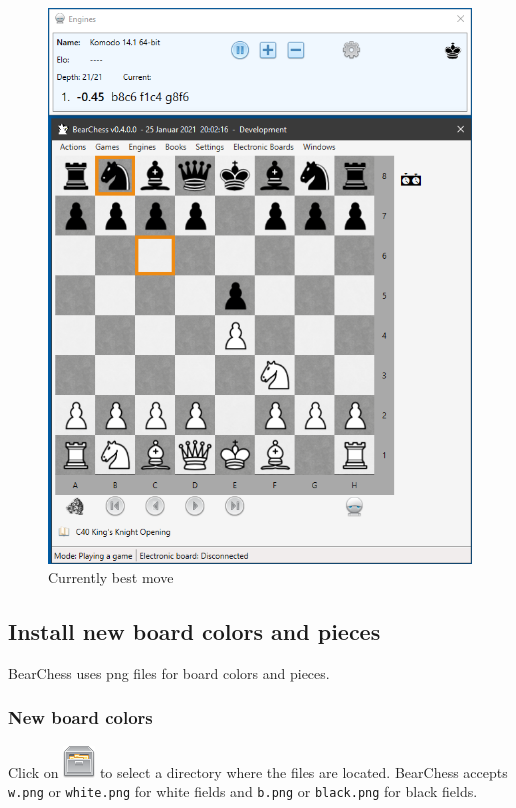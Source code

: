 \documentclass[11pt,a4paper]{article}
\begin{document}
\begin{figure}[H]
	\centering
	\includegraphics[scale=0.8]{BestMove.png}
	\caption{Currently best move }
	\label{fig:BestMove}
\end{figure}

\subsection{Install new board colors and pieces}
BearChess uses png files for board colors and pieces.

\subsubsection{New board colors}
Click on \includegraphics[scale=0.5]{file_manager.png} to select a directory where the files are located. BearChess accepts \verb|w.png| or \verb|white.png| for white fields and \verb|b.png| or \verb|black.png| for black fields.
\end{document}
